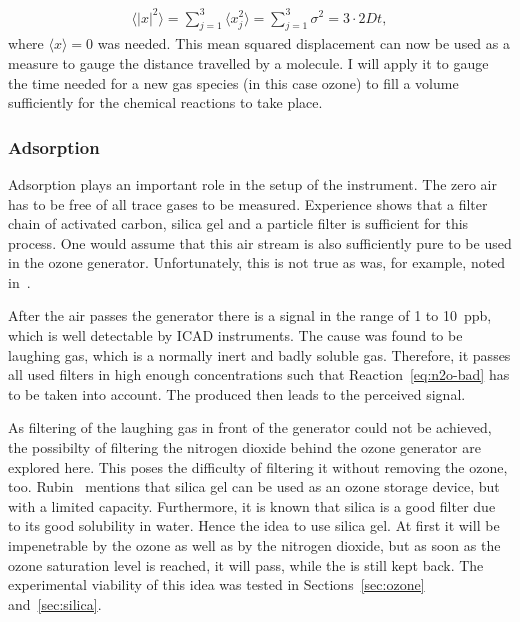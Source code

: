 \begin{align}
  \langle |x|^2 \rangle = \sum_{j=1}^3 \langle
  x_j^2 \rangle = \sum_{j=1}^3 \sigma^2 = 3 \cdot 2Dt, \label{eq:mqd}
\end{align}
where $\langle x \rangle = 0$ was needed. This mean squared
displacement can now be used as a measure to gauge the distance
travelled by a molecule. I will apply it to gauge the time needed for
a new gas species (in this case ozone) to fill a volume sufficiently
for the chemical reactions to take place.

\subsubsection{Adsorption}
\label{sec:adsorption}

Adsorption plays an important role in the setup of the instrument. The
zero air has to be free of all trace gases to be measured. Experience
shows that a filter chain of activated carbon, silica gel and a
particle filter is sufficient for this process. One would assume that
this air stream is also sufficiently pure to be used in the ozone
generator. Unfortunately, this is not true as was, for example, noted
in~\cite{bsc}.

After the air passes the generator there is a  signal in the
range of \num{1} to \SI{10}{ppb}, which is well detectable by ICAD
instruments. The cause was found to be laughing gas, which is a
normally inert and badly soluble gas. Therefore, it passes all used
filters in high enough concentrations such that
Reaction~\eqref{eq:n2o-bad} has to be taken into account. The produced
 then leads to the perceived  signal.

As filtering of the laughing gas in front of the generator could not
be achieved, the possibilty of filtering the nitrogen dioxide behind
the ozone generator are explored here. This poses the difficulty of
filtering it without removing the ozone, too. Rubin~\cite{ozone-silica}
mentions that silica gel can be used as an ozone storage
device, but with a limited capacity. Furthermore, it is known that
silica is a good  filter due to its good solubility in
water. Hence the idea to use silica gel. At first it will be
impenetrable by the ozone as well as by the nitrogen dioxide, but as
soon as the ozone saturation level is reached, it will pass, while the
 is still kept back. The experimental viability of this idea
was tested in Sections~\ref{sec:ozone} and~\ref{sec:silica}.

